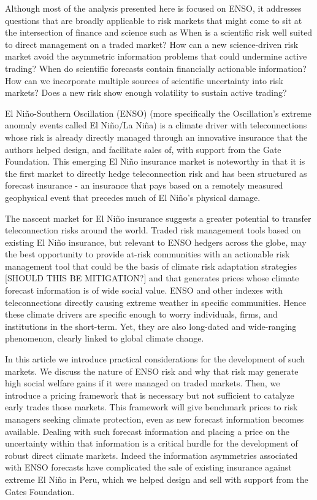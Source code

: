 \documentclass[authoryear]{article}
\begin{document}
Although most of the analysis presented here is focused on ENSO, it addresses questions that are broadly applicable to risk markets that might come to sit at the intersection of finance and science such as When is a scientific risk well suited to direct management on a traded market? How can a new science-driven risk market avoid the asymmetric information problems that could undermine active trading? When do scientific forecasts contain financially actionable information? How can we incorporate multiple sources of scientific uncertainty into risk markets? Does a new risk show enough volatility to sustain active trading? 

El Ni\~no-Southern Oscillation (ENSO) (more specifically the Oscillation's extreme anomaly events called El Ni\~no/La Ni\~na) is a climate driver with teleconnections whose risk is already directly managed through an innovative insurance that the authors helped design, and facilitate sales of, with support from the Gate Foundation. This emerging El Ni\~no insurance market is noteworthy in that it is the first market to directly hedge teleconnection risk and has been structured as forecast insurance - an insurance that pays based on a remotely measured geophysical event that precedes much of El Ni\~no's physical damage. 

The nascent market for El Ni\~no insurance suggests a greater potential to transfer teleconnection risks around the world. Traded risk management tools based on existing El Ni\~no insurance, but relevant to ENSO hedgers across the globe, may the best opportunity to provide at-risk communities with an actionable risk management tool that could be the basis of climate risk adaptation strategies [SHOULD THIS BE MITIGATION?] and that generates prices whose climate forecast information is of wide social value. ENSO and other indexes with teleconnections directly causing extreme weather in specific communities. Hence these climate drivers are specific enough to worry individuals, firms, and institutions in the short-term. Yet, they are also long-dated and wide-ranging phenomenon, clearly linked to global climate change. 

In this article we introduce practical considerations for the development of such markets. We discuss the nature of ENSO risk and why that risk may generate high social welfare gains if it were managed on traded markets. Then, we introduce a pricing framework that is necessary but not sufficient to catalyze early trades those markets. This framework will give benchmark prices to risk managers seeking climate protection, even as new forecast information becomes available. Dealing with such forecast information and placing a price on the uncertainty within that information is a critical hurdle for the development of robust direct climate markets. Indeed the information asymmetries associated with ENSO forecasts have complicated the sale of existing insurance against extreme El Ni\~no in Peru, which we helped design and sell with support from the Gates Foundation. 
\end{document}

